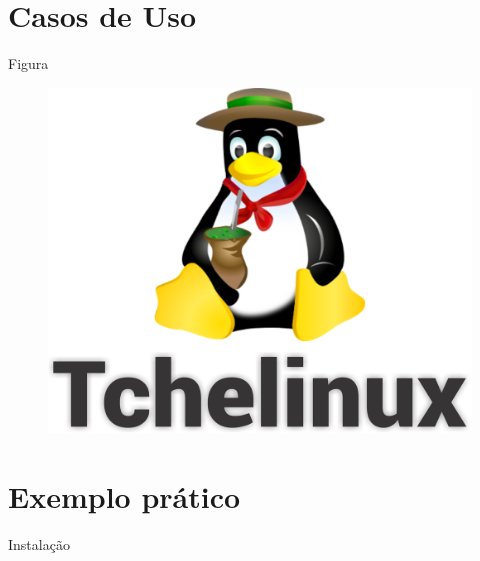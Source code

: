 \documentclass[aspectratio=1610]{beamer}}
\begin{document}
\section{Casos de Uso}

\begin{frame}{Figura}

	\begin{figure}[!htb]
		\centering
		\includegraphics[scale=.45]{fig/fig_logo.png}
	\end{figure}

\end{frame}




\section{Exemplo prático}
\begin{frame}{Instalação}
	
\end{frame}
\end{document}
